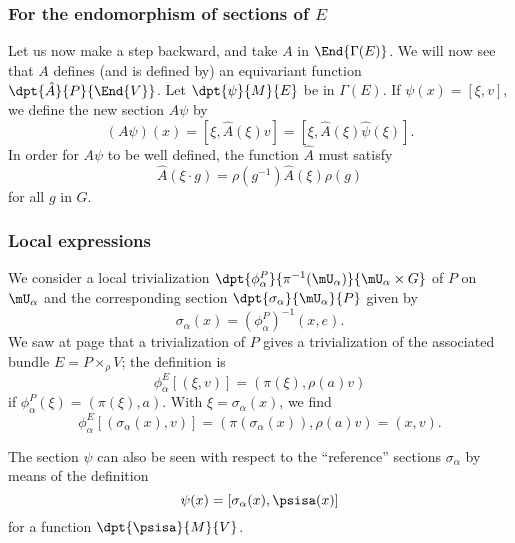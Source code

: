 											\subsubsection{For the endomorphism of sections of \texorpdfstring{$E$}{E}}\label{equivendo}

											Let us now make a step backward, and take $A$ in $\End{\Gamma(E)}$. We will now see that $A$ defines (and is defined by) an equivariant function $\dpt{\hat A}{P}{\End{V}}$. Let $\dpt{\psi}{M}{E}$ be in $\Gamma(E)$. If $\psi(x)=[\xi,v]$, we define the new section $A\psi$ by
											\[
												(A\psi)(x)=[\xi,\hat A(\xi)v]=[\xi,\hat A(\xi)\hat\psi(\xi)].
												\]
												In order for $A\psi$ to be well defined, the function $\hat A$ must satisfy
												\begin{equation}
												\hat A(\xi\cdot g)=\rho(g^{-1})\hat A(\xi)\rho(g)                 \label{equivA}
												\end{equation}
												for all $g$ in $G$.

												\subsubsection{Local expressions}

												We consider a local trivialization $\dpt{\phi^P_{\alpha}}{\pi^{-1}(\mU_{\alpha})}{\mU_{\alpha}\times G}$ of $P$ on $\mU_{\alpha}$ and the corresponding section $\dpt{\sigma_{\alpha}}{\mU_{\alpha}}{P}$ given by
												\[
													\sigma_{\alpha}(x)=(\phi^P_{\alpha})^{-1}(x,e).
													\]
													We saw at page \pageref{eq:triv_P_E} that a trivialization of $P$ gives a trivialization of the associated bundle $E=P\times_{\rho} V$; the definition is
													\begin{equation}
\phi^E_{\alpha}[(\xi,v)]=( \pi(\xi),\rho(a)v )
	\end{equation}
	if $\phi_{\alpha}^P(\xi)=(\pi(\xi),a)$. With $\xi=\sigma_{\alpha}(x)$, we find
	\begin{equation}
\phi^E_{\alpha}[(\sigma_{\alpha}(x),v)]=(  \pi(\sigma_{\alpha}(x)),\rho(a)v  )
	=(x,v).
	\end{equation}

	The section $\psi$ can also be seen with respect to the ``reference''{} sections $\sigma_{\alpha}$ by means of the definition
	\begin{equation}\label{eq:def:psisa}
	\psi(x)=[\sigma_{\alpha}(x),\psisa(x)]
	\end{equation}
	for a function $\dpt{\psisa}{M}{V}$.

